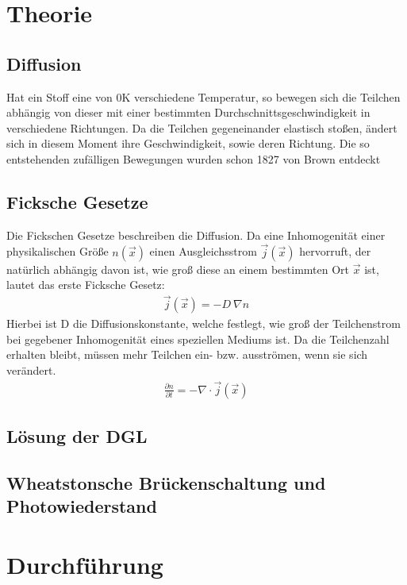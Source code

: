 \documentclass[12pt,a4paper,titlepage,headinclude,bibtotoc]{scrartcl}
\begin{document}
\section{Theorie}
\label{sec:theorie}
\subsection{Diffusion}
Hat ein Stoff eine von 0K verschiedene Temperatur, so bewegen sich die Teilchen abhängig von dieser mit einer bestimmten Durchschnittsgeschwindigkeit in verschiedene Richtungen.
Da die Teilchen gegeneinander elastisch stoßen, ändert sich in diesem Moment ihre Geschwindigkeit, sowie deren Richtung.
Die so entstehenden zufälligen Bewegungen wurden schon 1827 von Brown entdeckt \cite[S. 8]{demtroeder}

\subsection{Ficksche Gesetze}
Die Fickschen Gesetze beschreiben die Diffusion.
Da eine Inhomogenität einer physikalischen Größe $n(\vec x)$ einen Ausgleichsstrom $\vec j(\vec x)$ hervorruft, der natürlich abhängig davon ist, wie groß diese an einem bestimmten Ort $\vec x$ ist, lautet das erste Ficksche Gesetz:
\begin{align}
\vec j(\vec x)=-D ~ \nabla n
\end{align}
Hierbei ist D die Diffusionskonstante, welche festlegt, wie groß der Teilchenstrom bei gegebener Inhomogenität eines speziellen Mediums ist.
Da die Teilchenzahl erhalten bleibt, müssen mehr Teilchen ein- bzw. ausströmen, wenn sie sich verändert.
\begin{align}
 \frac{\partial n}{\partial t}=-\nabla\cdot \vec j(\vec x)
\end{align}


\subsection{Lösung der DGL}


\subsection{Wheatstonsche Brückenschaltung und Photowiederstand}



\section{Durchführung}
\label{sec:durchfuehrung}
\end{document}
